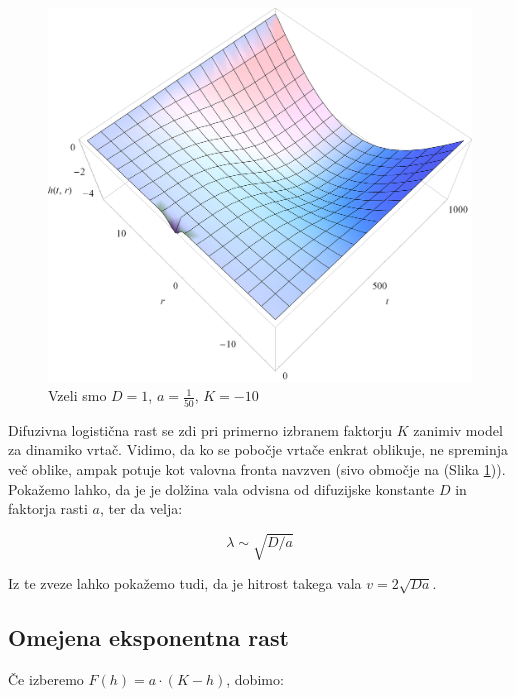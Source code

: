 \documentclass[a4paper, oneside, 12pt]{book}
\begin{document}
            \begin{figure}[H]
              \begin{center}
                \includegraphics[width=14cm]{slike/difuzija-logisticna-rast2}
              \end{center}
              \caption{Vzeli smo $D=1$, $a=\frac{1}{50}$, $K=-10$}
              \label{fig:difuzija-logisticna-rast}
            \end{figure}

            Difuzivna logistična rast se zdi pri primerno izbranem faktorju $K$ zanimiv model za dinamiko vrtač.
            Vidimo, da ko se pobočje vrtače enkrat oblikuje, ne spreminja več oblike, ampak potuje kot valovna fronta navzven (sivo območje na (Slika \ref{fig:difuzija-logisticna-rast})). Pokažemo lahko, da je je dolžina vala odvisna od difuzijske konstante $D$ in faktorja rasti $a$, ter da velja: 

           \[ \lambda \sim \sqrt{D/a} \]

          Iz te zveze lahko pokažemo tudi, da je hitrost takega vala $v = 2 \sqrt{D a}$.
\newpage

          \subsection{Omejena eksponentna rast}

          Če izberemo $F(h) = a \cdot (K - h)$, dobimo:
\end{document}
